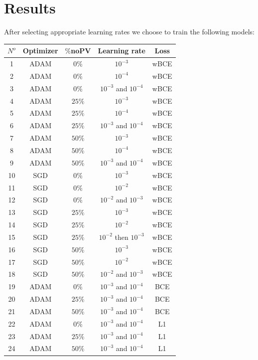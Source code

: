 \documentclass[10pt,conference]{IEEEtran}
\begin{document}
\section{Results}
After selecting appropriate learning rates we choose to train the following models:

\begin{center}
    \begin{tabular}{||c | c  | c | c | c ||} 
        \hline
        $N^o$ & Optimizer & $\%$noPV & Learning rate & Loss \\ [0.5ex] 
        \hline\hline
        1 & ADAM & $0\% $ & $10^{-3}$ & wBCE \\
        \hline
        2 & ADAM & $0\% $ & $10^{-4}$ & wBCE \\
        \hline
        3 & ADAM & $0\% $ & $10^{-3}$ and $10^{-4}$ & wBCE \\
        \hline
        4 & ADAM & $25\% $ & $10^{-3}$  & wBCE \\
        \hline
        5 & ADAM & $25\% $ & $10^{-4}$ & wBCE \\
        \hline
        6 & ADAM & $25\% $ & $10^{-3}$ and $10^{-4}$ & wBCE \\
        \hline
        7 & ADAM & $50\% $ & $10^{-3}$ & wBCE \\
        \hline
        8 & ADAM & $50\% $ & $10^{-4}$ & wBCE \\
        \hline
        9 & ADAM & $50\% $ & $10^{-3}$ and $10^{-4}$ & wBCE \\
        \hline
        10 & SGD & $0\% $ & $10^{-3}$ & wBCE \\
        \hline
        11 & SGD & $0\% $ & $10^{-2}$ & wBCE \\
        \hline
        12 & SGD & $0\% $ & $10^{-2}$ and $10^{-3}$ & wBCE \\
        \hline
        13 & SGD & $25\% $ & $10^{-3}$ & wBCE \\
        \hline
        14 & SGD & $25\% $ & $10^{-2}$ & wBCE \\
        \hline
        15 & SGD & $25\% $ & $10^{-2}$ then $10^{-3}$ & wBCE \\
        \hline
        16 & SGD & $50\% $ & $10^{-3}$ & wBCE \\
        \hline
        17 & SGD & $50\% $ & $10^{-2}$ & wBCE \\
        \hline
        18 & SGD & $50\% $ & $10^{-2}$ and $10^{-3}$ & wBCE \\
        \hline
        19 & ADAM & $0\% $ & $10^{-3}$ and $10^{-4}$ & BCE \\
        \hline
        20 & ADAM & $25\% $ & $10^{-3}$ and $10^{-4}$ & BCE \\
        \hline
        21 & ADAM & $50\% $ & $10^{-3}$ and $10^{-4}$ & BCE \\
        \hline
        22 & ADAM & $0\% $ & $10^{-3}$ and $10^{-4}$ & L1 \\
        \hline
        23 & ADAM & $25\% $ & $10^{-3}$ and $10^{-4}$ & L1 \\
        \hline
        24 & ADAM & $50\% $ & $10^{-3}$ and $10^{-4}$ & L1 \\
        \hline
        

\end{tabular}
\end{center}
\end{document}
